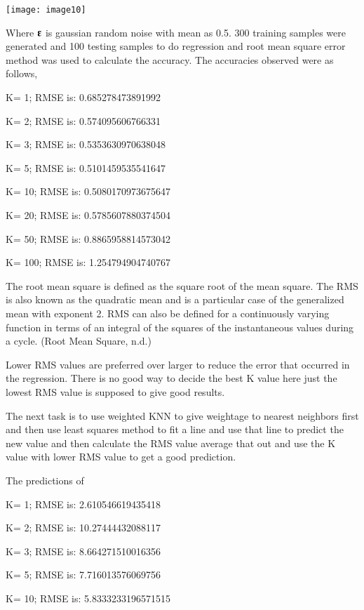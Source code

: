 \documentclass{article} %
\begin{document}
\noindent \texttt{[image: image10]}

\noindent Where \textbf{$\boldsymbol{\varepsilonup}$ }is gaussian random noise with mean as 0.5. 300 training samples were generated and 100 testing samples to do regression and root mean square error method was used to calculate the accuracy. The accuracies observed were as follows,

\noindent K= 1; RMSE is: 0.685278473891992

\noindent K= 2; RMSE is: 0.574095606766331

\noindent K= 3; RMSE is: 0.5353630970638048

\noindent K= 5; RMSE is: 0.5101459535541647

\noindent K= 10; RMSE is: 0.5080170973675647

\noindent K= 20; RMSE is: 0.5785607880374504

\noindent K= 50; RMSE is: 0.8865958814573042

\noindent K= 100; RMSE is: 1.254794904740767

\noindent The root mean square is defined as the square root of the mean square. The RMS is also known as the quadratic mean and is a particular case of the generalized mean with exponent 2. RMS can also be defined for a continuously varying function in terms of an integral of the squares of the instantaneous values during a cycle. (Root Mean Square, n.d.)

\noindent Lower RMS values are preferred over larger to reduce the error that occurred in the regression. There is no good way to decide the best K value here just the lowest RMS value is supposed to give good results. 

\noindent The next task is to use weighted KNN to give weightage to nearest neighbors first and then use least squares method to fit a line and use that line to predict the new value and then calculate the RMS value average that out and use the K value with lower RMS value to get a good prediction.

\noindent The predictions of 

\noindent K= 1; RMSE is: 2.610546619435418

\noindent K= 2; RMSE is: 10.27444432088117

\noindent K= 3; RMSE is: 8.664271510016356

\noindent K= 5; RMSE is: 7.716013576069756

\noindent K= 10; RMSE is: 5.8333233196571515
\end{document}
